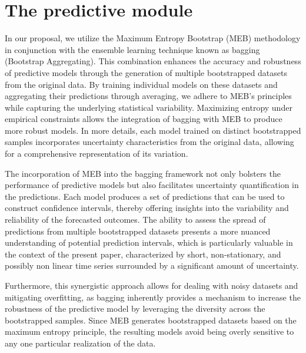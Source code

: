 \documentclass[ijoc,sglanonrev]{informs4}
\begin{document}

\section{The predictive module} \label{Sec:forecasting}

In our proposal, we utilize the Maximum Entropy Bootstrap (MEB) methodology in conjunction with the ensemble learning technique known as bagging (Bootstrap Aggregating). This combination enhances the accuracy and robustness of predictive models through the generation of multiple bootstrapped datasets from the original data. By training individual models on these datasets and aggregating their predictions through averaging, we adhere to MEB's principles while capturing the underlying statistical variability. Maximizing entropy under empirical constraints allows the integration of bagging with MEB to produce more robust models. In more details, each model trained on distinct bootstrapped samples incorporates uncertainty characteristics from the original data, allowing for a comprehensive representation of its variation.

The incorporation of MEB into the bagging framework not only bolsters the performance of predictive models but also facilitates uncertainty quantification in the predictions. Each model produces a set of predictions that can be used to construct confidence intervals, thereby offering insights into the variability and reliability of the forecasted outcomes. The ability to assess the spread of predictions from multiple bootstrapped datasets presents a more nuanced understanding of potential prediction intervals, which is particularly valuable in the context of the present paper, characterized by short, non-stationary, and possibly non linear time series surrounded by a significant amount of uncertainty.

Furthermore, this synergistic approach allows for dealing with noisy datasets and mitigating overfitting, as bagging inherently provides a mechanism to increase the robustness of the predictive model by leveraging the diversity across the bootstrapped samples. Since MEB generates bootstrapped datasets based on the maximum entropy principle, the resulting models avoid being overly sensitive to any one particular realization of the data.
\end{document}
